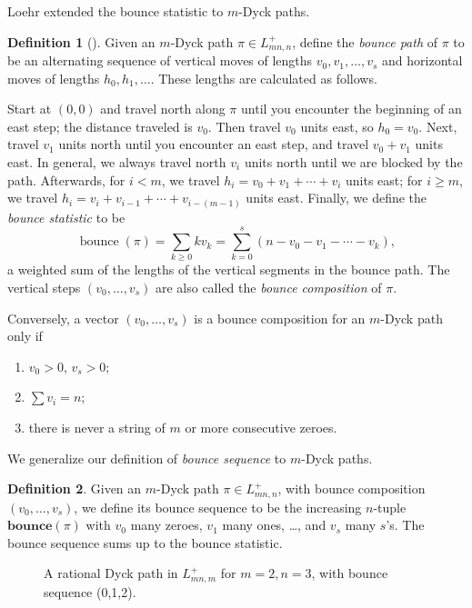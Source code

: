 \documentclass[12pt,reqno]{amsart}
\theoremstyle{definition}
\newtheorem{definition}{Definition}
\newcommand{\bbounce}{\mathbf{bounce}}
\DeclareMathOperator{\bounce}{bounce}
\begin{document}
Loehr extended the bounce statistic to $m$-Dyck paths.
\begin{definition}[\cite{MR2134172}]
    Given an $m$-Dyck path $\pi \in L_{mn,n}^+$, define the \emph{bounce path} of $\pi$ to be an alternating sequence of vertical moves of lengths $v_0,v_1,\dots,v_s$ and horizontal moves of lengths $h_0,h_1,\dots$. These lengths are calculated as follows.

    Start at $(0,0)$ and travel north along $\pi$ until you encounter the beginning of an east step; the distance traveled is $v_0$.
    Then travel $v_0$ units east, so $h_0 = v_0$.
    Next, travel $v_1$ units north until you encounter an east step, and travel $v_0+v_1$ units east.
    In general, we always travel north $v_i$ units north until we are blocked by the path.
    Afterwards, for $i < m$, we travel $h_i = v_0+v_1+\cdots+v_i$ units east;
    for $i \geq m$, we travel $h_i = v_i + v_{i-1} + \cdots + v_{i-(m-1)}$ units east.
    Finally, we define the \emph{bounce statistic} to be
    \begin{equation}
      \bounce(\pi) = \sum_{k\geq 0} k v_k = \sum_{k=0}^{s} (n-v_0-v_1-\cdots-v_k),
    \end{equation}
    a weighted sum of the lengths of the vertical segments in the bounce path.
    The vertical steps $(v_0,\dots,v_s)$ are also called the \emph{bounce composition} of $\pi$.

    Conversely, a vector $(v_0,\dots,v_s)$ is a bounce composition for an $m$-Dyck path only if
    \begin{enumerate}
      \item $v_0 > 0$, $v_s > 0$;
      \item $\sum v_i = n$;
      \item there is never a string of $m$ or more consecutive zeroes.
    \end{enumerate}
\end{definition}

We generalize our definition of \emph{bounce sequence} to $m$-Dyck paths.
\begin{definition}
Given an $m$-Dyck path $\pi \in L_{mn,n}^+$, with bounce composition $(v_0,\dots, v_s)$, we define its bounce sequence to be the increasing $n$-tuple $\bbounce(\pi)$ with $v_0$ many zeroes, $v_1$ many ones, \dots, and $v_s$ many $s$'s.
The bounce sequence sums up to the bounce statistic.
\end{definition}

\begin{figure}[H]
\caption{A rational Dyck path in $L_{mn,m}^+$ for $m=2, n=3$, with bounce sequence (0,1,2).}
\label{fig:111}
\end{figure}
\end{document}
